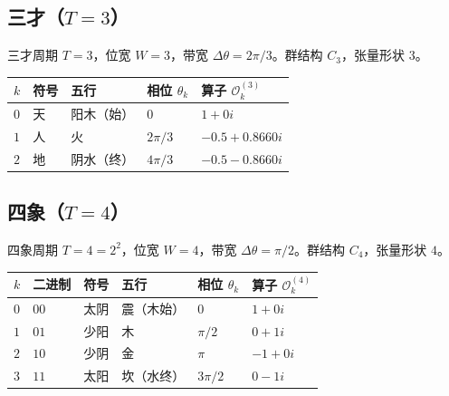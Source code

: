 \subsection{\texorpdfstring{三才（$T=3$）}{三才（T=3）}}

\begin{definition}[三才相位算子]\label{def:sancai_operators}
三才周期 $T=3$，位宽 $W=3$，带宽 $\Delta\theta=2\pi/3$。群结构 $C_3$，张量形状 $3$。
\end{definition}

\begin{center}
\begin{tabular}{>{\centering\arraybackslash}p{1.2cm}>{\centering\arraybackslash}p{1.5cm}>{\centering\arraybackslash}p{1.5cm}>{\centering\arraybackslash}p{2.5cm}>{\centering\arraybackslash}p{4cm}}
\toprule
$k$ & 符号 & 五行 & 相位 $\theta_k$ & 算子 $\mathcal{O}_k^{(3)}$ \\
\midrule
$0$ & 天 & 阳木（始） & $0$ & $1+0i$ \\
$1$ & 人 & 火 & $2\pi/3$ & $-0.5+0.8660i$ \\
$2$ & 地 & 阴水（终） & $4\pi/3$ & $-0.5-0.8660i$ \\
\bottomrule
\end{tabular}
\end{center}

\subsection{\texorpdfstring{四象（$T=4$）}{四象（T=4）}}

\begin{definition}[四象相位算子]\label{def:sixiang_operators}
四象周期 $T=4=2^2$，位宽 $W=4$，带宽 $\Delta\theta=\pi/2$。群结构 $C_4$，张量形状 $4$。
\end{definition}

\begin{center}
\begin{tabular}{>{\centering\arraybackslash}p{1.2cm}>{\centering\arraybackslash}p{1.2cm}>{\centering\arraybackslash}p{1.5cm}>{\centering\arraybackslash}p{1.5cm}>{\centering\arraybackslash}p{2.5cm}>{\centering\arraybackslash}p{3cm}}
\toprule
$k$ & 二进制 & 符号 & 五行 & 相位 $\theta_k$ & 算子 $\mathcal{O}_k^{(4)}$ \\
\midrule
$0$ & $00$ & 太阴 & 震（木始） & $0$ & $1+0i$ \\
$1$ & $01$ & 少阳 & 木 & $\pi/2$ & $0+1i$ \\
$2$ & $10$ & 少阴 & 金 & $\pi$ & $-1+0i$ \\
$3$ & $11$ & 太阳 & 坎（水终） & $3\pi/2$ & $0-1i$ \\
\bottomrule
\end{tabular}
\end{center}

